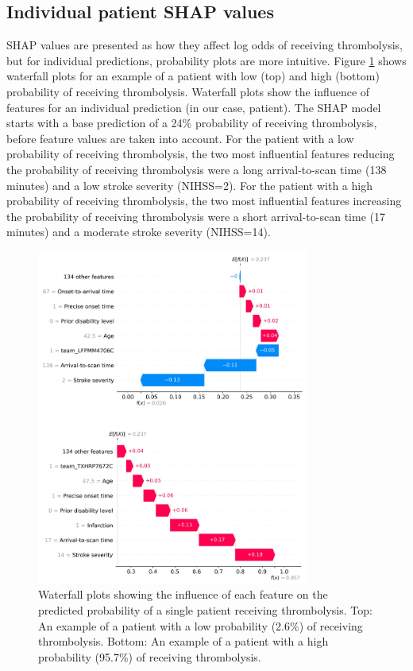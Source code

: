 \subsection{Individual patient SHAP values}
SHAP values are presented as how they affect log odds of receiving thrombolysis, but for individual predictions, probability plots are more intuitive. Figure \ref{fig:results_waterfall} shows waterfall plots for an example of a patient with low (top) and high (bottom) probability of receiving thrombolysis. Waterfall plots show the influence of features for an individual prediction (in our case, patient). The SHAP model starts with a base prediction of a 24\% probability of receiving thrombolysis, before feature values are taken into account. For the patient with a low probability of receiving thrombolysis, the two most influential features reducing the probability of receiving thrombolysis were a long arrival-to-scan time (138 minutes) and a low stroke severity (NIHSS=2). For the patient with a high probability of receiving thrombolysis, the two most influential features increasing the probability of receiving thrombolysis were a short arrival-to-scan time (17 minutes) and a moderate stroke severity (NIHSS=14). 

\begin{figure}[!h]
\centering
\includegraphics[width=0.8\textwidth]{./images/waterfall}
\caption{Waterfall plots showing the influence of each feature on the predicted probability of a single patient receiving thrombolysis. Top: An example of a patient with a low probability (2.6\%) of receiving thrombolysis. Bottom: An example of a patient with a high probability (95.7\%) of receiving thrombolysis.}
\label{fig:results_waterfall}
\end{figure}


